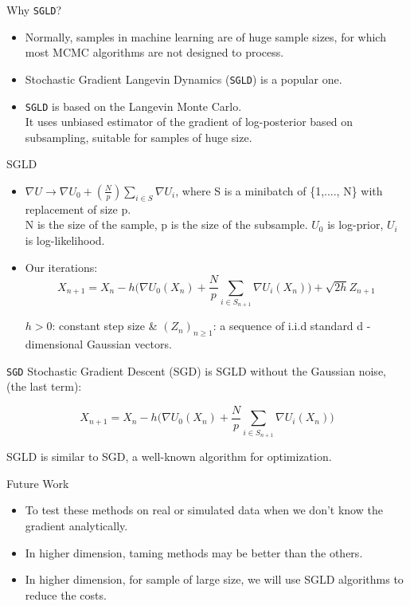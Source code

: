 \documentclass[aspectratio=169]{beamer}
\begin{document}
\begin{frame}{Why \texttt{SGLD}?}
  \begin{itemize}
      \item Normally, samples in machine learning are of huge sample sizes, for which most MCMC algorithms are not designed to process. 
      \item Stochastic Gradient Langevin Dynamics (\texttt{SGLD}) is a popular one. 
      \item \texttt{SGLD} is based on the Langevin Monte Carlo.\\
            It uses unbiased estimator of the gradient of log-posterior based on subsampling, suitable for samples of huge size. 
  \end{itemize} 
\end{frame}
\begin{frame}{SGLD}
\begin{itemize}
    \item $\nabla U \to \nabla U_0+(\frac{N}{p}) \sum_{i\in S}\nabla U_i$,  where S is a minibatch of \{1,...., N\} with replacement of size p.\\
    N is the size of the sample, p is the size of the subsample. 
    $U_0$ is log-prior, $U_i$ is log-likelihood.
\item Our iterations:
$$X_{n+1} = X_{n}-h \Bigg (\nabla U_0(X_n)+\frac{N}{p}\sum_{i\in S_{n+1}}\nabla U_i(X_n)\Bigg )+\sqrt{2h}Z_{n+1}$$

$h > 0$: constant step size & $(Z_n)_{n\geq1}$: a sequence of i.i.d standard d - dimensional Gaussian vectors. 
\end{itemize}
\end{frame}
\begin{frame}{\texttt{SGD}}
    Stochastic Gradient Descent (SGD) is SGLD without the Gaussian noise, (the last term):

$$X_{n+1} = X_{n}-h \Bigg (\nabla U_0(X_n)+\frac{N}{p}\sum_{i\in S_{n+1}}\nabla U_i(X_n)\Bigg)$$

SGLD is similar to SGD, a well-known algorithm for optimization. 
\end{frame}




\begin{frame}{Future Work}
\begin{itemize}
    \item To test these methods on  real or simulated data when we don't know the gradient analytically.
   \item In higher dimension, taming methods may be better than the others.
    \item In higher dimension, for sample of large size, we will use SGLD algorithms to reduce the costs.
\end{itemize}
\end{frame}
\end{document}
